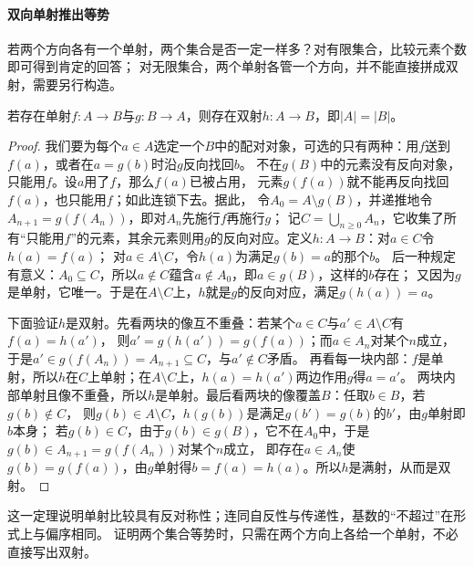 \paragraph{双向单射推出等势}
若两个方向各有一个单射，两个集合是否一定一样多？对有限集合，比较元素个数即可得到肯定的回答；
对无限集合，两个单射各管一个方向，并不能直接拼成双射，需要另行构造。
\begin{theorem}
\label{thm:comb-cantor-schroeder-bernstein}
若存在单射$f:A\to B$与$g:B\to A$，则存在双射$h:A\to B$，即$|A|=|B|$。
\end{theorem}
\begin{proof}
我们要为每个$a\in A$选定一个$B$中的配对对象，可选的只有两种：用$f$送到$f(a)$，或者在$a=g(b)$时沿$g$反向找回$b$。
不在$g(B)$中的元素没有反向对象，只能用$f$。设$a$用了$f$，那么$f(a)$已被占用，
元素$g(f(a))$就不能再反向找回$f(a)$，也只能用$f$；如此连锁下去。据此，
令$A_0=A\setminus g(B)$，并递推地令$A_{n+1}=g(f(A_n))$，即对$A_n$先施行$f$再施行$g$；
记$C=\bigcup_{n\geq0}A_n$，它收集了所有“只能用$f$”的元素，其余元素则用$g$的反向对应。定义$h:A\to B$：对$a\in C$令$h(a)=f(a)$；
对$a\in A\setminus C$，令$h(a)$为满足$g(b)=a$的那个$b$。
后一种规定有意义：$A_0\subseteq C$，所以$a\notin C$蕴含$a\notin A_0$，即$a\in g(B)$，这样的$b$存在；
又因为$g$是单射，它唯一。于是在$A\setminus C$上，$h$就是$g$的反向对应，满足$g(h(a))=a$。

下面验证$h$是双射。先看两块的像互不重叠：若某个$a\in C$与$a'\in A\setminus C$有$f(a)=h(a')$，
则$a'=g(h(a'))=g(f(a))$；而$a\in A_n$对某个$n$成立，于是$a'\in g(f(A_n))=A_{n+1}\subseteq C$，与$a'\notin C$矛盾。
再看每一块内部：$f$是单射，所以$h$在$C$上单射；在$A\setminus C$上，$h(a)=h(a')$两边作用$g$得$a=a'$。
两块内部单射且像不重叠，所以$h$是单射。最后看两块的像覆盖$B$：任取$b\in B$，若$g(b)\notin C$，
则$g(b)\in A\setminus C$，$h(g(b))$是满足$g(b')=g(b)$的$b'$，由$g$单射即$b$本身；
若$g(b)\in C$，由于$g(b)\in g(B)$，它不在$A_0$中，于是$g(b)\in A_{n+1}=g(f(A_n))$对某个$n$成立，
即存在$a\in A_n$使$g(b)=g(f(a))$，由$g$单射得$b=f(a)=h(a)$。所以$h$是满射，从而是双射。
\end{proof}
这一定理说明单射比较具有反对称性；连同自反性与传递性，基数的“不超过”在形式上与偏序相同。
证明两个集合等势时，只需在两个方向上各给一个单射，不必直接写出双射。

